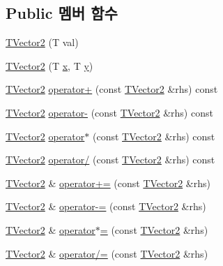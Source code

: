 \subsection*{Public 멤버 함수}
\begin{DoxyCompactItemize}
\item 
\hyperlink{classcpf_1_1_t_vector2_aaed071ed32aa0e7fb5d8dc15e65aa2e5}{T\+Vector2} (T val)
\item 
\hyperlink{classcpf_1_1_t_vector2_af7ee05ecb6fb7c9f0f17cc1c021bfad0}{T\+Vector2} (T \hyperlink{classcpf_1_1_t_vector2_a2c0ac9258353351f1435070a2307e9e1}{x}, T \hyperlink{classcpf_1_1_t_vector2_a727b923b39a876bbb13c810bcf6eecff}{y})
\item 
\hyperlink{classcpf_1_1_t_vector2}{T\+Vector2} \hyperlink{classcpf_1_1_t_vector2_a46e25d7c045977e31686fd39b5ea2dcc}{operator+} (const \hyperlink{classcpf_1_1_t_vector2}{T\+Vector2} \&rhs) const
\item 
\hyperlink{classcpf_1_1_t_vector2}{T\+Vector2} \hyperlink{classcpf_1_1_t_vector2_ac6262f8170df345618e7fa2f658952e3}{operator-\/} (const \hyperlink{classcpf_1_1_t_vector2}{T\+Vector2} \&rhs) const
\item 
\hyperlink{classcpf_1_1_t_vector2}{T\+Vector2} \hyperlink{classcpf_1_1_t_vector2_a16a9e29d378cf8f0cf75be9399318788}{operator$\ast$} (const \hyperlink{classcpf_1_1_t_vector2}{T\+Vector2} \&rhs) const
\item 
\hyperlink{classcpf_1_1_t_vector2}{T\+Vector2} \hyperlink{classcpf_1_1_t_vector2_ae53c4a8c87a80f446e0f7a05a22c4f32}{operator/} (const \hyperlink{classcpf_1_1_t_vector2}{T\+Vector2} \&rhs) const
\item 
\hyperlink{classcpf_1_1_t_vector2}{T\+Vector2} \& \hyperlink{classcpf_1_1_t_vector2_aab38c633df2681dd730d03ba1847baba}{operator+=} (const \hyperlink{classcpf_1_1_t_vector2}{T\+Vector2} \&rhs)
\item 
\hyperlink{classcpf_1_1_t_vector2}{T\+Vector2} \& \hyperlink{classcpf_1_1_t_vector2_af1447b3026d2a071abed16bc68e578e1}{operator-\/=} (const \hyperlink{classcpf_1_1_t_vector2}{T\+Vector2} \&rhs)
\item 
\hyperlink{classcpf_1_1_t_vector2}{T\+Vector2} \& \hyperlink{classcpf_1_1_t_vector2_a4c58534c578f3361dda26c4c79613e0d}{operator$\ast$=} (const \hyperlink{classcpf_1_1_t_vector2}{T\+Vector2} \&rhs)
\item 
\hyperlink{classcpf_1_1_t_vector2}{T\+Vector2} \& \hyperlink{classcpf_1_1_t_vector2_aa95668b1b19d1aa9a39092a64aee5ef7}{operator/=} (const \hyperlink{classcpf_1_1_t_vector2}{T\+Vector2} \&rhs)

\end{DoxyCompactItemize}

